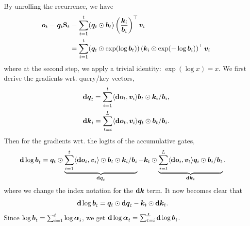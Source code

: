 By unrolling the recurrence, we have
\begin{align*}
{\bm{o}}_t =  {\bm{q}}_t {\mathbf{S}}_t  &= \sum_{i=1}^{t}({\bm{q}}_t \odot {\bm{b}}_t) \left(\frac{{\bm{k}}_i}{{\bm{b}}_i}\right)^{\top} {\bm{v}}_i \\
&=  \sum_{i=1}^{t}({\bm{q}}_t \odot \exp(\log {\bm{b}}_t)) \left({\bm{k}}_i \odot {\exp(- \log {\bm{b}}_i)}\right)^{\top} {\bm{v}}_i
\end{align*}
where at the second step, we apply a trivial identity: $\exp(\log x) = x$.
%
We first derive the gradients wrt. query/key vectors,
\begin{align*}
& {\mathbf{d}\bm{q}}_t = \sum_{ i = 1}^{t} \langle {\mathbf{d}\bm{o}}_t, {\bm{v}}_i\rangle  {\bm{b}}_t \odot {\bm{k}}_i / {\bm{b}}_i,  \\
& {\mathbf{d}\bm{k}}_i = \sum_{t = i}^{L} \langle {\mathbf{d}\bm{o}}_t, {\bm{v}}_i\rangle  {\bm{q}}_t \odot  {\bm{b}}_t  / {\bm{b}}_i.
\end{align*}
Then for the gradients wrt. the logits of the accumulative gates,
%
\begin{align*}
& {\mathbf{d}\log\bm{b}}_t  = {\bm{q}}_t \odot \underbrace{\sum_{i=1}^{t} \langle {\mathbf{d}\bm{o}}_t, {\bm{v}}_i\rangle  \odot  {\bm{b}}_t  \odot  {\bm{k}}_i / {\bm{b}}_i}_{  {\mathbf{d}\bm{q}}_t} - {\bm{k}}_t \odot \underbrace{\sum_{i = t}^{L} \langle {\mathbf{d}\bm{o}}_i, {\bm{v}}_t\rangle  {\bm{q}}_i \odot  {\bm{b}}_i  / {\bm{b}}_t}_{{\mathbf{d}\bm{k}}_t}.
\end{align*}
where we change the index notation for the ${\mathbf{d}\bm{k}}$ term.
It now becomes clear that 
%
\begin{align*}
& {\mathbf{d}\log\bm{b}}_t =  {\bm{q}}_t \odot {\mathbf{d}\bm{q}}_t  - {\bm{k}}_t \odot {\mathbf{d}\bm{k}}_t.
\end{align*}
Since ${\log\bm{b}}_t = \sum_{i=1}^t {\log\bm{\alpha}}_i$, we get ${\mathbf{d}\log\bm{\alpha}}_t  = \sum_{t = i}^L {\mathbf{d}\log\bm{b}}_i$.



